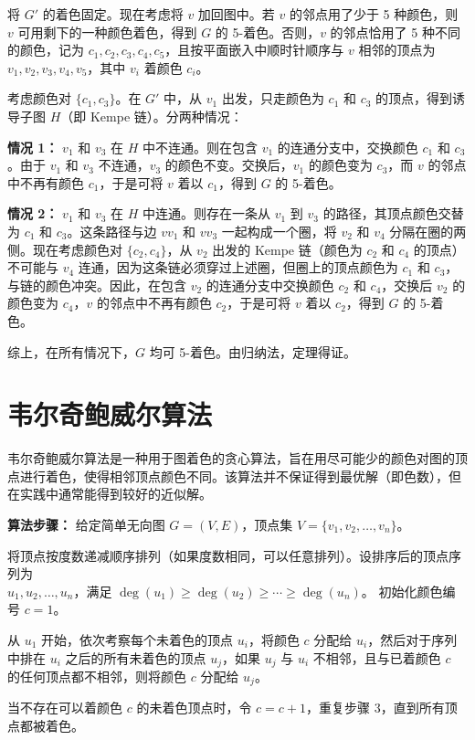 \documentclass[lang=cn,11pt]{elegantbook}
\begin{document}
    将 $G'$ 的着色固定。现在考虑将 $v$ 加回图中。若 $v$ 的邻点用了少于 5 种颜色，则 $v$ 可用剩下的一种颜色着色，得到 $G$ 的 5-着色。否则，$v$ 的邻点恰用了 5 种不同的颜色，记为 $c_1, c_2, c_3, c_4, c_5$，且按平面嵌入中顺时针顺序与 $v$ 相邻的顶点为 $v_1, v_2, v_3, v_4, v_5$，其中 $v_i$ 着颜色 $c_i$。

    考虑颜色对 $\{c_1, c_3\}$。在 $G'$ 中，从 $v_1$ 出发，只走颜色为 $c_1$ 和 $c_3$ 的顶点，得到诱导子图 $H$（即 Kempe 链）。分两种情况：

    \textbf{情况 1：} $v_1$ 和 $v_3$ 在 $H$ 中不连通。则在包含 $v_1$ 的连通分支中，交换颜色 $c_1$ 和 $c_3$。由于 $v_1$ 和 $v_3$ 不连通，$v_3$ 的颜色不变。交换后，$v_1$ 的颜色变为 $c_3$，而 $v$ 的邻点中不再有颜色 $c_1$，于是可将 $v$ 着以 $c_1$，得到 $G$ 的 5-着色。

    \textbf{情况 2：} $v_1$ 和 $v_3$ 在 $H$ 中连通。则存在一条从 $v_1$ 到 $v_3$ 的路径，其顶点颜色交替为 $c_1$ 和 $c_3$。这条路径与边 $v v_1$ 和 $v v_3$ 一起构成一个圈，将 $v_2$ 和 $v_4$ 分隔在圈的两侧。现在考虑颜色对 $\{c_2, c_4\}$，从 $v_2$ 出发的 Kempe 链（颜色为 $c_2$ 和 $c_4$ 的顶点）不可能与 $v_4$ 连通，因为这条链必须穿过上述圈，但圈上的顶点颜色为 $c_1$ 和 $c_3$，与链的颜色冲突。因此，在包含 $v_2$ 的连通分支中交换颜色 $c_2$ 和 $c_4$，交换后 $v_2$ 的颜色变为 $c_4$，$v$ 的邻点中不再有颜色 $c_2$，于是可将 $v$ 着以 $c_2$，得到 $G$ 的 5-着色。

    综上，在所有情况下，$G$ 均可 5-着色。由归纳法，定理得证。
\section{韦尔奇鲍威尔算法}
    韦尔奇鲍威尔算法是一种用于图着色的贪心算法，旨在用尽可能少的颜色对图的顶点进行着色，使得相邻顶点颜色不同。该算法并不保证得到最优解（即色数），但在实践中通常能得到较好的近似解。

    \textbf{算法步骤：}
    给定简单无向图 $G=(V,E)$，顶点集 $V=\{v_1,v_2,\ldots,v_n\}$。
    
         将顶点按度数递减顺序排列（如果度数相同，可以任意排列）。设排序后的顶点序列为\\$u_1,u_2,\ldots,u_n$，满足 $\deg(u_1) \ge \deg(u_2) \ge \cdots \ge \deg(u_n)$。
         初始化颜色编号 $c=1$。

         从 $u_1$ 开始，依次考察每个未着色的顶点 $u_i$，将颜色 $c$ 分配给 $u_i$，然后对于序列中排在 $u_i$ 之后的所有未着色的顶点 $u_j$，如果 $u_j$ 与 $u_i$ 不相邻，且与已着颜色 $c$ 的任何顶点都不相邻，则将颜色 $c$ 分配给 $u_j$。

         当不存在可以着颜色 $c$ 的未着色顶点时，令 $c=c+1$，重复步骤 3，直到所有顶点都被着色。
    
\end{document}
